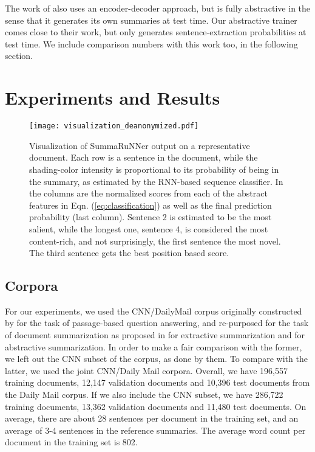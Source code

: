 \documentclass[letterpaper]{article}
\begin{document}
The work of \cite{nallapati_conll} also uses an encoder-decoder approach, but is fully abstractive in the sense that it generates its own summaries at test time. Our abstractive trainer comes close to their work, but only generates sentence-extraction probabilities at test time. We include comparison numbers with this work too, in the following section.

\section{Experiments and Results}\label{sec:exp}

\begin{figure*}[htpb]
    \vspace{-0.6in}
	\centering
  \texttt{[image: visualization\_deanonymized.pdf]}
  	\vspace{-2.7in}
	\caption{{\small Visualization of SummaRuNNer output on a representative document. Each row is a sentence in the document, while the shading-color intensity is proportional to its probability of being in the summary, as estimated by the RNN-based sequence classifier. In the columns are the normalized scores from each of the abstract features in Eqn. (\ref{eq:classification}) as well as the final prediction probability (last column). Sentence 2 is estimated to be the most salient, while the longest one, sentence 4, is considered the most content-rich, and not surprisingly, the first sentence the most novel. The third sentence gets the best position based score.}}
	\label{fig:heatmap}
\end{figure*}

\subsection{Corpora} 
For our experiments, we used the CNN/DailyMail corpus originally constructed by \cite{reading_comprehension} for the task of passage-based question answering, and re-purposed for the task of document summarization as proposed in   \cite{jianpeng} for extractive summarization and \cite{nallapati_conll} for abstractive summarization. In order to make a fair comparison with the former, we left out the CNN subset of the corpus, as done by them. To compare with the latter, we used the joint CNN/Daily Mail corpora. Overall, we have 196,557 training documents, 12,147 validation documents and 10,396 test documents from the Daily Mail corpus. If we also include the CNN subset, we have 286,722 training documents, 13,362 validation documents and 11,480 test documents. On average, there are about 28 sentences per document in the training set, and an average of 3-4 sentences in the reference summaries. The average word count per document in the training set is 802.
\end{document}
